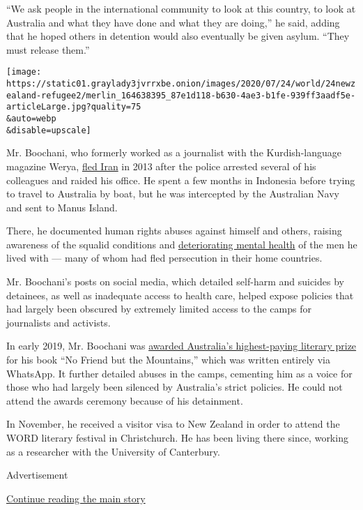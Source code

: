 ``We ask people in the international community to look at this country,
to look at Australia and what they have done and what they are doing,''
he said, adding that he hoped others in detention would also eventually
be given asylum. ``They must release them.''

\texttt{[image: https://static01.graylady3jvrrxbe.onion/images/2020/07/24/world/24newzealand-refugee2/merlin\_164638395\_87e1d118-b630-4ae3-b1fe-939ff3aadf5e-articleLarge.jpg?quality=75\\\&auto=webp\\\&disable=upscale]}

Mr. Boochani, who formerly worked as a journalist with the
Kurdish-language magazine Werya,
\href{https://www.nytimes3xbfgragh.onion/2017/02/13/insider/manus-island-refugee-australia.html}{fled
Iran} in 2013 after the police arrested several of his colleagues and
raided his office. He spent a few months in Indonesia before trying to
travel to Australia by boat, but he was intercepted by the Australian
Navy and sent to Manus Island.

There, he documented human rights abuses against himself and others,
raising awareness of the squalid conditions and
\href{https://www.nytimes3xbfgragh.onion/2018/11/05/world/australia/nauru-island-asylum-refugees-children-suicide.html}{deteriorating
mental health} of the men he lived with --- many of whom had fled
persecution in their home countries.

Mr. Boochani's posts on social media, which detailed self-harm and
suicides by detainees, as well as inadequate access to health care,
helped expose policies that had largely been obscured by extremely
limited access to the camps for journalists and activists.

In early 2019, Mr. Boochani was
\href{https://www.nytimes3xbfgragh.onion/2019/01/31/world/australia/behrouz-boochani-victorian-prize-manus-island.html}{awarded
Australia's highest-paying literary prize} for his book ``No Friend but
the Mountains,'' which was written entirely via WhatsApp. It further
detailed abuses in the camps, cementing him as a voice for those who had
largely been silenced by Australia's strict policies. He could not
attend the awards ceremony because of his detainment.

In November, he received a visitor visa to New Zealand in order to
attend the WORD literary festival in Christchurch. He has been living
there since, working as a researcher with the University of Canterbury.

Advertisement

\protect\hyperlink{after-bottom}{Continue reading the main story}

